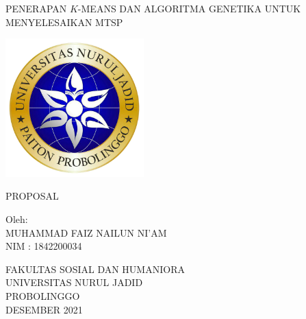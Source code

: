 \begin{titlepage}
   \begin{center}

       PENERAPAN $K$-MEANS DAN ALGORITMA GENETIKA UNTUK MENYELESAIKAN MTSP

       \vfill
       
       \includegraphics[width=0.4\textwidth]{logo.png}
       
       \vfill
       
       PROPOSAL
       
       \vfill
       
       Oleh:\\
       MUHAMMAD FAIZ NAILUN NI'AM\\
       NIM : 1842200034

       \vfill
       
       FAKULTAS SOSIAL DAN HUMANIORA\\       
       UNIVERSITAS NURUL JADID\\
       PROBOLINGGO\\
       DESEMBER 2021
       
   \end{center}
\end{titlepage}